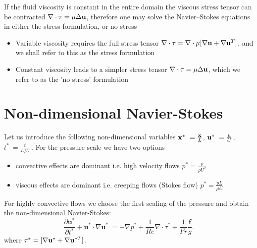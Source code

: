 If the fluid viscosity is constant in the entire domain the viscous stress tensor can be contracted \(\nabla\cdot\tau=\mu\Delta \mathbf{u}\), therefore one may solve the Navier--Stokes equations in either the stress formulation, or no stress

\begin{itemize}
\item Variable viscosity requires the full stress tensor \(\nabla \cdot \tau=\nabla \cdot \mu[\nabla \mathbf{u}+\nabla \mathbf{u}^{T}]\), and we shall refer to this as the stress formulation
\item Constant viscosity leads to a simpler stress tensor \(\nabla \cdot \tau=\mu\Delta \mathbf{u}\), which we refer to as the 'no stress' formulation
\end{itemize}

\section{Non-dimensional Navier-Stokes}
Let us introduce the following non-dimensional variables \(\mathbf{x}^*\ = \frac{\mathbf{x}}{L}\), \(\mathbf{u}^*\ = \frac{u}{U}\), \(t^*\ = \frac{t}{L/U}\,\).
For the pressure scale we have two options 
\begin{itemize}
\item convective effects are dominant i.e. high velocity flows
\( p^* = \frac{p}{\rho U^2} \)
\item viscous effects are dominant i.e. creeping flows (Stokes flow)
\( p^* = \frac{p L}{\mu U} \)
\end{itemize}
For highly convective flows we choose the first scaling of the pressure and obtain the non-dimensional Navier-Stokes:
\begin{equation}\label{eq:NS_nondim}
\frac{\partial \mathbf{u^*}}{\partial t^*} + \mathbf{u^*} \cdot \nabla \mathbf{u^*}\ = -\nabla p^* + \frac{1}{Re} \nabla\cdot \tau^* + \frac{1}{Fr}\frac{\mathbf{f}}{g}.
\end{equation}
where \( \tau^*=[\nabla \mathbf{u}^*+\nabla \mathbf{u}^{*T}]\).
